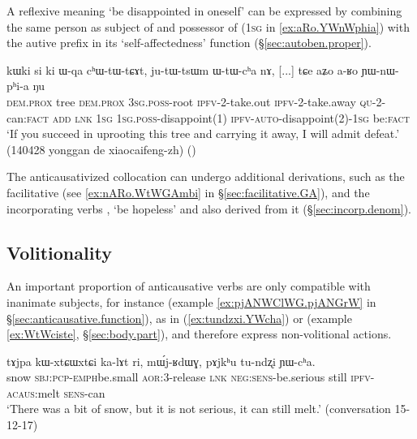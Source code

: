A reflexive meaning `be disappointed in oneself'  can be expressed by combining the same person as subject of  and possessor of   (\textsc{1sg} in  \ref{ex:aRo.YWnWphia}) with the autive prefix  in its `self-affectedness' function (§\ref{sec:autoben.proper}).

 \begin{exe}
\ex \label{ex:aRo.YWnWphia}
\gll kɯki si ki ɯ-qa cʰɯ-tɯ-tɕɤt, ju-tɯ-tsɯm ɯ-tɯ-cʰa nɤ,  [...] tɕe aʑo a-ʁo ɲɯ-nɯ-pʰi-a ŋu  \\
\textsc{dem}.\textsc{prox} tree \textsc{dem}.\textsc{prox} \textsc{3sg}.\textsc{poss}-root \textsc{ipfv}-2-take.out \textsc{ipfv}-2-take.away \textsc{qu}-2-can:\textsc{fact} \textsc{add} {  } \textsc{lnk} \textsc{1sg} \textsc{1sg}.\textsc{poss}-disappoint(1) \textsc{ipfv}-\textsc{auto}-disappoint(2)-\textsc{1sg} be:\textsc{fact} \\
\glt `If you succeed in uprooting this tree and carrying it away, I will admit defeat.' (140428 yonggan de xiaocaifeng-zh)
()
\end{exe}

The anticausativized collocation  can undergo additional derivations, such as the facilitative (see \ref{ex:nARo.WtWGAmbi} in §\ref{sec:facilitative.GA}), and the incorporating verbs , `be hopeless' and  also derived from it (§\ref{sec:incorp.denom}).

\subsection{Volitionality} \label{sec:anticausative.volitionality} 
An important proportion of anticausative verbs are only compatible with inanimate subjects, for instance  (example \ref{ex:pjANWClWG.pjANGrW} in §\ref{sec:anticausative.function}),  as in (\ref{ex:tundzxi.YWcha}) or  (example \ref{ex:WtWciste}, §\ref{sec:body.part}), and therefore express non-volitional actions.

\begin{exe}
\ex \label{ex:tundzxi.YWcha}
\gll tɤjpa kɯ-xtɕɯ\redp{}xtɕi ka-lɤt ri, mɯ́j-ʁdɯɣ, pɤjkʰu tu-ndʐi ɲɯ-cʰa. \\
snow \textsc{sbj}:\textsc{pcp}-\textsc{emph}\redp{}be.small \textsc{aor}:3\flobv{}-release \textsc{lnk} \textsc{neg}:\textsc{sens}-be.serious still \textsc{ipfv}-\textsc{acaus}:melt \textsc{sens}-can \\
\glt `There was a bit of snow, but it is not serious, it can still melt.' (conversation 15-12-17)
\end{exe} 


